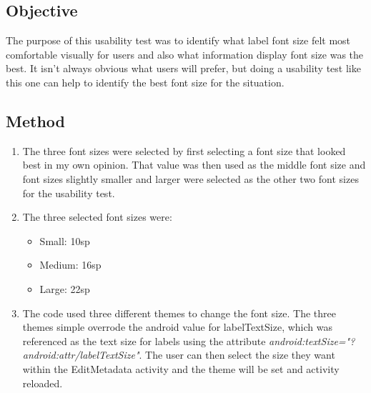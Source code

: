 \documentclass[11pt,english,numbers=endperiod,parskip=half]{scrartcl}
\begin{document}
\subsection{Objective}
\raggedright
The purpose of this usability test was to identify what label font size felt most comfortable visually for users and also what information display font size was the best. It isn't always obvious what users will prefer, but doing a usability test like this one can help to identify the best font size for the situation.
\subsection{Method}
\begin{enumerate}
	\item{The three font sizes were selected by first selecting a font size that looked best in my own opinion. That value was then used as the middle font size and font sizes slightly smaller and larger were selected as the other two font sizes for the usability test.}
	\item{The three selected font sizes were:
		\begin{itemize}
			\item{Small: 10sp}
			\item{Medium: 16sp}
			\item{Large: 22sp}
		\end{itemize}
	}
	\item{The code used three different themes to change the font size. The three themes simple overrode the android value for labelTextSize, which was referenced as the text size for labels using the attribute \textit{android:textSize="?android:attr/labelTextSize"}. The user can then select the size they want within the EditMetadata activity and the theme will be set and activity reloaded.}
\end{enumerate}
\end{document}
